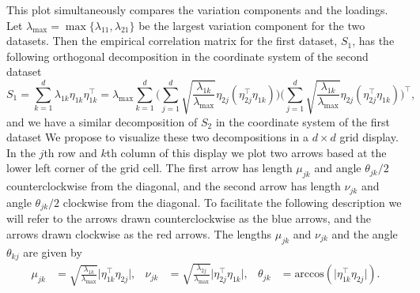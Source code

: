 \documentclass[titlepage,11pt,twoside]{article}
\newcommand{\hl}[1]{\textcolor{magenta}{#1}}
\newcommand{\acos}{\text{arccos}}
\begin{document}
This plot simultaneously compares the variation components and the loadings. Let $\lambda_{\max} = \max\{ \lambda_{11}, \lambda_{21} \}$ be the largest variation component for the two datasets. Then the empirical correlation matrix for the first dataset, $S_1$, has the following orthogonal decomposition in the coordinate system of the second dataset
\begin{equation*}
S_1 = \sum_{k=1}^d \lambda_{1k} \eta_{1k} \eta_{1k}^\top
= \lambda_{\max} \sum_{k=1}^d
\Bigg( \sum_{j=1}^d \sqrt{\frac{\lambda_{1k}}{\lambda_{\max}}} \eta_{2j} (\eta_{2j}^\top \eta_{1k}) \Bigg)
\Bigg( \sum_{j=1}^d \sqrt{\frac{\lambda_{1k}}{\lambda_{\max}}} \eta_{2j} (\eta_{2j}^\top \eta_{1k}) \Bigg)^\top,
\end{equation*}
and we have a similar decomposition of $S_2$ in the coordinate system of the first dataset %
We propose to visualize these two decompositions in a $d \times d$ grid display. In the $j$th row and $k$th column of this display we plot two arrows based at the lower left corner of the grid cell. The first arrow has length $\mu_{jk}$ and angle $\theta_{jk}/2$ counterclockwise from the diagonal, and the second arrow has length $\nu_{jk}$ and angle $\theta_{jk}/2$ clockwise from the diagonal. To facilitate the following description we will refer to the arrows drawn counterclockwise as the blue arrows, and the arrows drawn clockwise as the red arrows. The lengths $\mu_{jk}$ and $\nu_{jk}$ and the angle $\theta_{kj}$ are given by
\begin{align*}
\mu_{jk} &= \sqrt{\frac{\lambda_{1k}}{\lambda_{\max}}} \lvert \eta_{1k}^\top \eta_{2j} \rvert, &
\nu_{jk} &= \sqrt{\frac{\lambda_{2j}}{\lambda_{\max}}} \lvert \eta_{2j}^\top \eta_{1k} \rvert, &
\theta_{jk} &= \acos(\lvert \eta_{1k}^\top \eta_{2j} \rvert).
\end{align*}
\end{document}
